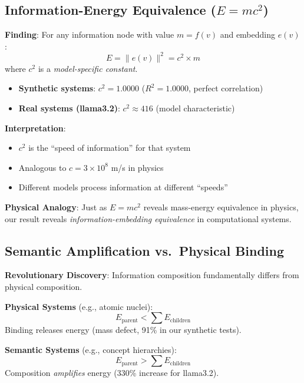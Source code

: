 \documentclass[11pt,a4paper]{article}
\newcommand{\norm}[1]{\|#1\|}
\begin{document}
\subsection{Information-Energy Equivalence ($E=mc^2$)}

\textbf{Finding}: For any information node with value $m = f(v)$ and embedding $e(v)$:
\begin{equation}
E = \norm{e(v)}^2 = c^2 \times m
\end{equation}
where $c^2$ is a \emph{model-specific constant}.

\begin{itemize}
    \item \textbf{Synthetic systems}: $c^2 = 1.0000$ ($R^2 = 1.0000$, perfect correlation)
    \item \textbf{Real systems (llama3.2)}: $c^2 \approx 416$ (model characteristic)
\end{itemize}

\textbf{Interpretation}: 
\begin{itemize}
    \item $c^2$ is the ``speed of information'' for that system
    \item Analogous to $c = 3 \times 10^8$ m/s in physics
    \item Different models process information at different ``speeds''
\end{itemize}

\textbf{Physical Analogy}: Just as $E=mc^2$ reveals mass-energy equivalence in physics, our result reveals \emph{information-embedding equivalence} in computational systems.

\subsection{Semantic Amplification vs.\ Physical Binding}

\textbf{Revolutionary Discovery}: Information composition fundamentally differs from physical composition.

\textbf{Physical Systems} (e.g., atomic nuclei):
\begin{equation}
E_{\text{parent}} < \sum E_{\text{children}}
\end{equation}
Binding releases energy (mass defect, 91\% in our synthetic tests).

\textbf{Semantic Systems} (e.g., concept hierarchies):
\begin{equation}
E_{\text{parent}} > \sum E_{\text{children}}
\end{equation}
Composition \emph{amplifies} energy (330\% increase for llama3.2).
\end{document}

